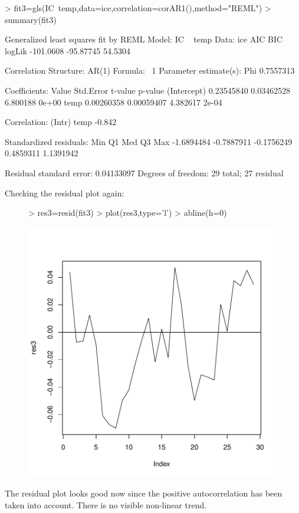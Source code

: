 \documentclass[12pt]{article}
\begin{document}
\begin{itemize}
\begin{Schunk}
\begin{Sinput}
> fit3=gls(IC~temp,data=ice,correlation=corAR1(),method="REML")
> summary(fit3)
\end{Sinput}
\begin{Soutput}
Generalized least squares fit by REML
  Model: IC ~ temp 
  Data: ice 
        AIC       BIC  logLik
  -101.0608 -95.87745 54.5304

Correlation Structure: AR(1)
 Formula: ~1 
 Parameter estimate(s):
      Phi 
0.7557313 

Coefficients:
                 Value  Std.Error  t-value p-value
(Intercept) 0.23545840 0.03462528 6.800188   0e+00
temp        0.00260358 0.00059407 4.382617   2e-04

 Correlation: 
     (Intr)
temp -0.842

Standardized residuals:
       Min         Q1        Med         Q3        Max 
-1.6894484 -0.7887911 -0.1756249  0.4859311  1.1391942 

Residual standard error: 0.04133097 
Degrees of freedom: 29 total; 27 residual
\end{Soutput}
\end{Schunk}
\clearpage
Checking the residual plot again:
\begin{figure}[H]
\begin{Schunk}
\begin{Sinput}
> res3=resid(fit3)
> plot(res3,type='l')
> abline(h=0)
\end{Sinput}
\end{Schunk}
\includegraphics{HW7-009}
\end{figure}
The residual plot looks good now since the positive autocorrelation has been taken into account. There is no visible non-linear trend.\\


\end{itemize}
\end{document}
